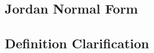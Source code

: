 \subsection{Jordan Normal Form}
\label{Q2 connection between transpose and conjugate}
\subsection{Definition Clarification }


